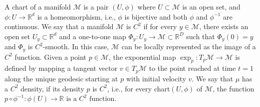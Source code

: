 \documentclass{article}
\def\red{\textcolor{red}}
\def\calM{\mathcal{M}}
\begin{document}
A chart of a manifold $\mathcal{M}$ is a pair $(U, \phi)$ where $U \subset \mathcal{M}$ is an open set, and $\phi: U \rightarrow \mathbb{R}^d$ is a homeomorphism, i.e., $\phi$ is bijective and both $\phi$ and $\phi^{-1}$ are continuous.
We say that a manifold \( \mathcal{M} \) is \( C^2 \) if for every \( y \in \mathcal{M} \), there exists an open set \( U_y \subset \mathbb{R}^d \) and a one-to-one map \( \Phi_y: U_y \to \calM\subset\mathbb{R}^D \) such that \( \Phi_y(0) = y \) and \( \Phi_y \) is \( C^2 \)-smooth. In this case, \( \mathcal{M} \) can be locally represented as the image of a \( C^2 \) function. 
Given a point \( p \in \mathcal{M} \), the exponential map \( \exp_p: T_p\mathcal{M} \to \mathcal{M} \) is defined by mapping a tangent vector \( v \in T_p\mathcal{M} \) to the point reached at time \( t=1 \) along the unique geodesic starting at \( p \) with initial velocity \( v \).
 We say that \(\mu\) has a \(C^2\) density, if its density \(p\) is \(C^2\), i.e., for every chart\(  (U, \phi)\) of \( \mathcal{M}\), the function \(p \circ \phi^{-1}: \phi(U) \rightarrow \mathbb{R} \text { is a } C^2 \text { function. }\)
\end{document}
